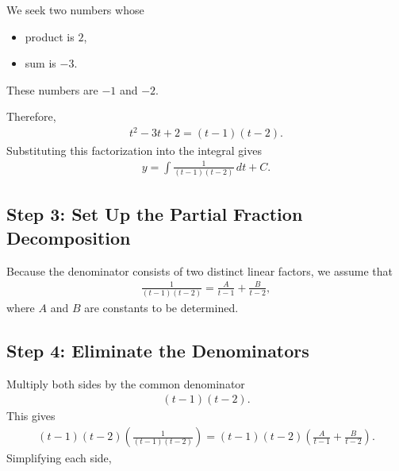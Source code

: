 \documentclass[letterpaper,10pt,english]{sphinxmanual}
\begin{document}
\sphinxAtStartPar
We seek two numbers whose
\begin{itemize}
\item {} 
\sphinxAtStartPar
product is \(2\),

\item {} 
\sphinxAtStartPar
sum is \(-3\).

\end{itemize}

\sphinxAtStartPar
These numbers are \(-1\) and \(-2\).

\sphinxAtStartPar
Therefore,
\begin{equation*}
\begin{split}t^2-3t+2=(t-1)(t-2).\end{split}
\end{equation*}
\sphinxAtStartPar
Substituting this factorization into the integral gives
\begin{equation*}
\begin{split}y=\int \frac{1}{(t-1)(t-2)}\,dt + C.\end{split}
\end{equation*}

\subsection{Step 3: Set Up the Partial Fraction Decomposition}
\label{\detokenize{Language/Science_language/ODE_calculus/course_MATH_3035/homework_assignments/index_pdf:step-3-set-up-the-partial-fraction-decomposition}}
\sphinxAtStartPar
Because the denominator consists of two distinct linear factors,
we assume that
\begin{equation*}
\begin{split}\frac{1}{(t-1)(t-2)}
=
\frac{A}{t-1}
+
\frac{B}{t-2},\end{split}
\end{equation*}
\sphinxAtStartPar
where \(A\) and \(B\) are constants to be determined.


\subsection{Step 4: Eliminate the Denominators}
\label{\detokenize{Language/Science_language/ODE_calculus/course_MATH_3035/homework_assignments/index_pdf:step-4-eliminate-the-denominators}}
\sphinxAtStartPar
Multiply both sides by the common denominator
\begin{equation*}
\begin{split}(t-1)(t-2).\end{split}
\end{equation*}
\sphinxAtStartPar
This gives
\begin{equation*}
\begin{split}(t-1)(t-2)
\left(
\frac{1}{(t-1)(t-2)}
\right)
=
(t-1)(t-2)
\left(
\frac{A}{t-1}
+
\frac{B}{t-2}
\right).\end{split}
\end{equation*}
\sphinxAtStartPar
Simplifying each side,
\end{document}
